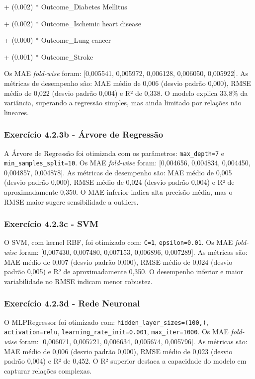 \documentclass[conference]{IEEEtran}
\begin{document}
+ (0.002) * Outcome\_Diabetes Mellitus 

+ (0.002) * Outcome\_Ischemic heart disease 

+ (0.000) * Outcome\_Lung cancer 

+ (0.001) * Outcome\_Stroke

\medskip

Os MAE \textit{fold-wise} foram: [0,005541, 0,005972, 0,006128, 0,006050, 0,005922]. As métricas de desempenho são: MAE médio de 0,006 (desvio padrão 0,000), RMSE médio de 0,022 (desvio padrão 0,004) e R² de 0,338. O modelo explica 33,8\% da variância, superando a regressão simples, mas ainda limitado por relações não lineares.

\medskip
\subsubsection{\textbf{Exercício 4.2.3b - Árvore de Regressão}}

A Árvore de Regressão foi otimizada com os parâmetros: \texttt{max\_depth=7} e \texttt{min\_samples\_split=10}. Os MAE \textit{fold-wise} foram: [0,004656, 0,004834, 0,004450, 0,004857, 0,004878]. As métricas de desempenho são: MAE médio de 0,005 (desvio padrão 0,000), RMSE médio de 0,024 (desvio padrão 0,004) e R² de aproximadamente 0,350. O MAE inferior indica alta precisão média, mas o RMSE maior sugere sensibilidade a outliers.

\medskip
\subsubsection{\textbf{Exercício 4.2.3c - SVM}}

O SVM, com kernel RBF, foi otimizado com: \texttt{C=1}, \texttt{epsilon=0.01}. Os MAE \textit{fold-wise} foram: [0,007430, 0,007480, 0,007153, 0,006896, 0,007289]. As métricas são: MAE médio de 0,007 (desvio padrão 0,000), RMSE médio de 0,024 (desvio padrão 0,005) e R² de aproximadamente 0,350. O desempenho inferior e maior variabilidade no RMSE indicam menor robustez.

\medskip
\subsubsection{\textbf{Exercício 4.2.3d - Rede Neuronal}}

O MLPRegressor foi otimizado com: \texttt{hidden\_layer\_sizes=(100,)}, \texttt{activation=relu}, \texttt{learning\_rate\_init=0.001}, \texttt{max\_iter=1000}. Os MAE \textit{fold-wise} foram: [0,006071, 0,005721, 0,006634, 0,005674, 0,005796]. As métricas são: MAE médio de 0,006 (desvio padrão 0,000), RMSE médio de 0,023 (desvio padrão 0,004) e R² de 0,452. O R² superior destaca a capacidade do modelo em capturar relações complexas.
\end{document}
